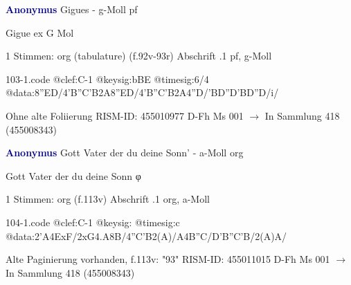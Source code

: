 \documentclass[twocolumn]{book}
\begin{document}
\newline \par \vspace{7pt} \textcolor{darkblue}{\textbf{Anonymus  }}
\newline Gigues - g-Moll
\newline pf
\newline \begin{itshape} Gigue ex G Mol\end{itshape} 
\newline \textcolor{darkblue}{}  1 Stimmen: org (tabulature)  (f.92v-93r)
\newline Abschrift
.1  pf, g-Moll  
\begin{filecontents*}{103-1.code}
@clef:C-1
@keysig:bBE
@timesig:6/4
@data:{8''ED}/4'B''C'B2A{8''ED}/4'B''C'B2A4''D/'BD''D'BD''D/i/
\end{filecontents*}
\newline
%
\newline Ohne alte Foliierung
\newline RISM-ID: 455010977
\newline D-Fh  Ms 001
\newline $\rightarrow$ In Sammlung 418 (455008343)
      
\newline \par \vspace{7pt} \textcolor{darkblue}{\textbf{Anonymus  }}
\newline Gott Vater der du deine Sonn' - a-Moll
\newline org
\newline \begin{itshape}[f.113v, heading:] Gott Vater der du deine Sonn φ\end{itshape} 
\newline \textcolor{darkblue}{}  1 Stimmen: org  (f.113v)
\newline Abschrift
.1  org, a-Moll  
\begin{filecontents*}{104-1.code}
@clef:C-1
@keysig:
@timesig:c
@data:2'A4ExF/2xG4.A8B/4''C'B2(A)/A4B''C/D'B''C'B/2(A)A/
\end{filecontents*}
\newline
%
\newline Alte Paginierung vorhanden, f.113v: "93"
\newline RISM-ID: 455011015
\newline D-Fh  Ms 001
\newline $\rightarrow$ In Sammlung 418 (455008343)
      
\end{document}
